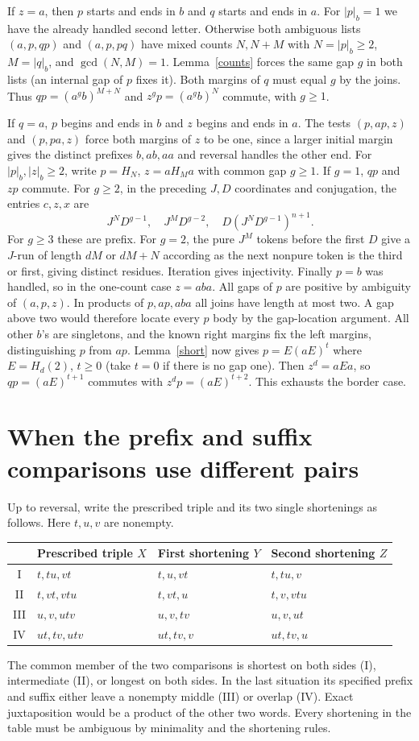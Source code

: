 \documentclass[11pt,a4paper]{article}
\newcommand{\bct}[1]{\lvert #1\rvert_b}
\begin{document}
If $z=a$, then $p$ starts and ends in $b$ and $q$ starts and ends in $a$. For $\bct p=1$ we have the already handled second letter. Otherwise both ambiguous lists $(a,p,qp)$ and $(a,p,pq)$ have mixed counts $N,N+M$ with $N=\bct p\ge2$, $M=\bct q$, and $\gcd(N,M)=1$. Lemma~\ref{counts} forces the same gap $g$ in both lists (an internal gap of $p$ fixes it). Both margins of $q$ must equal $g$ by the joins. Thus $qp=(a^g b)^{M+N}$ and $z^g p=(a^g b)^N$ commute, with $g\ge1$.

If $q=a$, $p$ begins and ends in $b$ and $z$ begins and ends in $a$. The tests $(p,ap,z)$ and $(p,pa,z)$ force both margins of $z$ to be one, since a larger initial margin gives the distinct prefixes $b,ab,aa$ and reversal handles the other end. For $\bct p,\bct z\ge2$, write $p=H_N$, $z=aH_M a$ with common gap $g\ge1$. If $g=1$, $qp$ and $zp$ commute. For $g\ge2$, in the preceding $J,D$ coordinates and conjugation, the entries $c,z,x$ are
\[
 J^N D^{g-1},\quad J^M D^{g-2},\quad D(J^N D^{g-1})^{n+1}.
\]
For $g\ge3$ these are prefix. For $g=2$, the pure $J^M$ tokens before the first $D$ give a $J$-run of length $dM$ or $dM+N$ according as the next nonpure token is the third or first, giving distinct residues. Iteration gives injectivity. Finally $p=b$ was handled, so in the one-count case $z=aba$. All gaps of $p$ are positive by ambiguity of $(a,p,z)$. In products of $p,ap,aba$ all joins have length at most two. A gap above two would therefore locate every $p$ body by the gap-location argument. All other $b$'s are singletons, and the known right margins fix the left margins, distinguishing $p$ from $ap$. Lemma~\ref{short} now gives $p=E(aE)^t$ where $E=H_d(2)$, $t\ge0$ (take $t=0$ if there is no gap one). Then $z^d=aEa$, so $qp=(aE)^{t+1}$ commutes with $z^d p=(aE)^{t+2}$. This exhausts the border case.
\section{When the prefix and suffix comparisons use different pairs}
Up to reversal, write the prescribed triple and its two single shortenings as follows. Here $t,u,v$ are nonempty.
\begin{center}
\begin{tabular}{c@{\qquad}lll}\toprule
& Prescribed triple $X$ & First shortening $Y$ & Second shortening $Z$\\\midrule
I   & $t,tu,vt$     & $t,u,vt$    & $t,tu,v$\\
II  & $t,vt,vtu$    & $t,vt,u$    & $t,v,vtu$\\
III & $u,v,utv$     & $u,v,tv$    & $u,v,ut$\\
IV  & $ut,tv,utv$   & $ut,tv,v$   & $ut,tv,u$\\\bottomrule
\end{tabular}
\end{center}
The common member of the two comparisons is shortest on both sides (I), intermediate (II), or longest on both sides. In the last situation its specified prefix and suffix either leave a nonempty middle (III) or overlap (IV). Exact juxtaposition would be a product of the other two words. Every shortening in the table must be ambiguous by minimality and the shortening rules.
\end{document}
